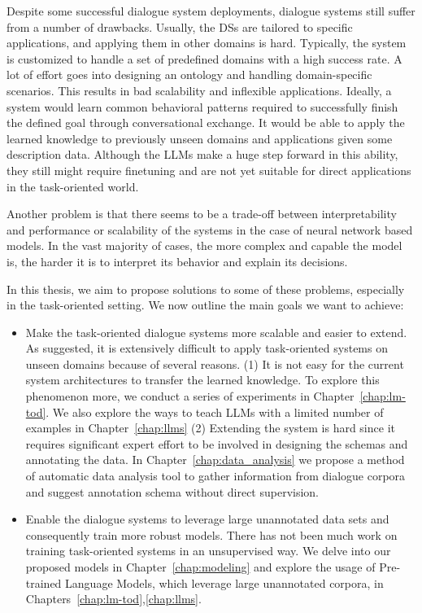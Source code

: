 Despite some successful dialogue system deployments, dialogue systems still suffer from a number of drawbacks.
Usually, the DSs are tailored to specific applications, and applying them in other domains is hard.
Typically, the system is customized to handle a set of predefined domains with a high success rate.
A lot of effort goes into designing an ontology and handling domain-specific scenarios.
This results in bad scalability and inflexible applications.
Ideally, a system would learn common behavioral patterns required to successfully finish the defined goal through conversational exchange.
It would be able to apply the learned knowledge to previously unseen domains and applications given some description data.
Although the LLMs make a huge step forward in this ability, they still might require finetuning and are not yet suitable for direct applications in the task-oriented world.

Another problem is that there seems to be a trade-off between interpretability and performance or scalability of the systems in the case of neural network based models.
In the vast majority of cases, the more complex and capable the model is, the harder it is to interpret its behavior and explain its decisions.

In this thesis, we aim to propose solutions to some of these problems, especially in the task-oriented setting.
We now outline the main goals we want to achieve:
\begin{itemize}
    \item Make the task-oriented dialogue systems more scalable and easier to extend. As suggested, it is extensively difficult to apply task-oriented systems on unseen domains because of several reasons. (1) It is not easy for the current system architectures to transfer the learned knowledge. To explore this phenomenon more, we conduct a series of experiments in Chapter~\ref{chap:lm-tod}. We also explore the ways to teach LLMs with a limited number of examples in Chapter~\ref{chap:llms} (2) Extending the system is hard since it requires significant expert effort to be involved in designing the schemas and annotating the data. In Chapter~\ref{chap:data_analysis} we propose a method of automatic data analysis tool to gather information from dialogue corpora and suggest annotation schema without direct supervision.
    \item Enable the dialogue systems to leverage large unannotated data sets and consequently train more robust models. There has not been much work on training task-oriented systems in an unsupervised way. We delve into our proposed models in Chapter~\ref{chap:modeling} and explore the usage of Pre-trained Language Models, which leverage large unannotated corpora, in Chapters~\ref{chap:lm-tod},\ref{chap:llms}.
\end{itemize}

